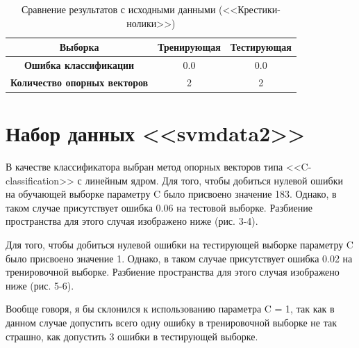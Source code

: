 \documentclass[]{article}
\numberwithin{equation}{section}
\begin{document}
        \begin{table}[H]
            \centering
            \begin{tabular}{|c|c|c|}
              \hline
              \textbf{Выборка}  & Тренирующая & Тестирующая \\
              \hline
              \textbf{Ошибка классификации} & 0.0 & 0.0\\
              \hline
              \textbf{Количество опорных векторов} & 2 & 2\\
              \hline
            \end{tabular}
            \caption{Сравнение результатов с исходными данными (<<Крестики-нолики>>)}
        \end{table}

    \section{Набор данных <<svmdata2>>}
        В качестве классификатора выбран метод опорных векторов типа <<C-classification>> с линейным ядром. Для того, чтобы добиться нулевой ошибки на обучающей выборке параметру C было присвоено значение 183. Однако, в таком случае присутствует ошибка 0.06 на тестовой выборке. Разбиение пространства для этого случая изображено ниже (рис. 3-4).

        Для того, чтобы добиться нулевой ошибки на тестирующей выборке параметру C было присвоено значение 1. Однако, в таком случае присутствует ошибка 0.02 на тренировочной выборке. Разбиение пространства для этого случая изображено ниже (рис. 5-6).

        Вообще говоря, я бы склонился к использованию параметра C = 1, так как в данном случае допустить всего одну ошибку в тренировочной выборке не так страшно, как допустить 3 ошибки в тестирующей выборке.
\end{document}
